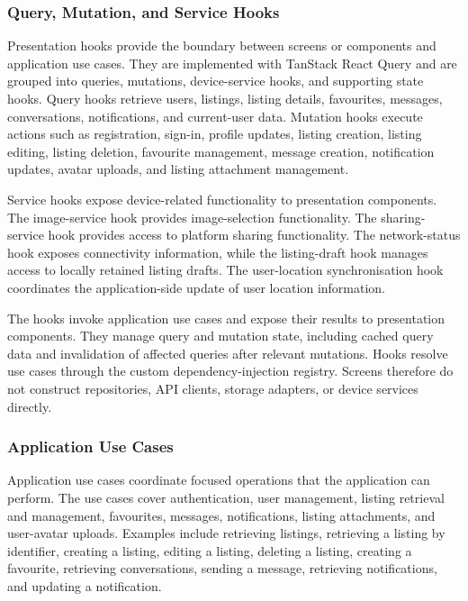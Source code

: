 \subsubsection{Query, Mutation, and Service Hooks}
\label{sec:c3-hooks}

Presentation hooks provide the boundary between screens or components and application use cases.
They are implemented with TanStack React Query and are grouped into queries, mutations, device-service hooks, and supporting state hooks.
Query hooks retrieve users, listings, listing details, favourites, messages, conversations, notifications, and current-user data.
Mutation hooks execute actions such as registration, sign-in, profile updates, listing creation, listing editing, listing deletion, favourite management, message creation, notification updates, avatar uploads, and listing attachment management.

Service hooks expose device-related functionality to presentation components.
The image-service hook provides image-selection functionality.
The sharing-service hook provides access to platform sharing functionality.
The network-status hook exposes connectivity information, while the listing-draft hook manages access to locally retained listing drafts.
The user-location synchronisation hook coordinates the application-side update of user location information.

The hooks invoke application use cases and expose their results to presentation components.
They manage query and mutation state, including cached query data and invalidation of affected queries after relevant mutations.
Hooks resolve use cases through the custom dependency-injection registry.
Screens therefore do not construct repositories, API clients, storage adapters, or device services directly.

\subsubsection{Application Use Cases}
\label{sec:c3-use-cases}

Application use cases coordinate focused operations that the application can perform.
The use cases cover authentication, user management, listing retrieval and management, favourites, messages, notifications, listing attachments, and user-avatar uploads.
Examples include retrieving listings, retrieving a listing by identifier, creating a listing, editing a listing, deleting a listing, creating a favourite, retrieving conversations, sending a message, retrieving notifications, and updating a notification.

